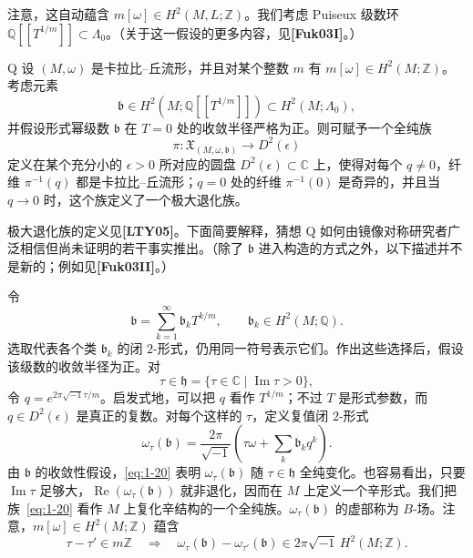 注意，这自动蕴含 $m[\omega]\in H^2(M,L;\mathbb Z)$。我们考虑 Puiseux 级数环 $\mathbb Q[[T^{1/m}]]\subset\Lambda_0$。（关于这一假设的更多内容，见\textbf{[Fuk03I]}。）

\begin{conjecture}{Q}\label{conj:intro-Q}
设 $(M,\omega)$ 是卡拉比--丘流形，并且对某个整数 $m$ 有
$m[\omega]\in H^2(M;\mathbb Z)$。考虑元素
\[
  \mathfrak b\in H^2(M;\mathbb Q[[T^{1/m}]])
  \subset H^2(M;\Lambda_0),
\]
并假设形式幂级数 $\mathfrak b$ 在 $T=0$ 处的收敛半径严格为正。则可赋予一个全纯族
\begin{equation}
  \pi:\mathfrak X_{(M,\omega,\mathfrak b)}\longrightarrow D^2(\epsilon)
  \tag{1.19}\label{eq:1-19}
\end{equation}
定义在某个充分小的 $\epsilon>0$ 所对应的圆盘 $D^2(\epsilon)\subset\mathbb C$ 上，使得对每个 $q\ne0$，纤维 $\pi^{-1}(q)$ 都是卡拉比--丘流形；$q=0$ 处的纤维 $\pi^{-1}(0)$ 是奇异的，并且当 $q\to0$ 时，这个族定义了一个极大退化族。
\end{conjecture}

极大退化族的定义见\textbf{[LTY05]}。下面简要解释，猜想 Q 如何由镜像对称研究者广泛相信但尚未证明的若干事实推出。（除了 $\mathfrak b$ 进入构造的方式之外，以下描述并不是新的；例如见\textbf{[Fuk03II]}。）

令
\[
  \mathfrak b=\sum_{k=1}^{\infty}\mathfrak b_kT^{k/m},
  \qquad \mathfrak b_k\in H^2(M;\mathbb Q).
\]
选取代表各个类 $\mathfrak b_k$ 的闭 $2$-形式，仍用同一符号表示它们。作出这些选择后，假设该级数的收敛半径为正。对
\[
  \tau\in\mathfrak h=\{\tau\in\mathbb C\mid\operatorname{Im}\tau>0\},
\]
令 $q=e^{2\pi\sqrt{-1}\tau/m}$。启发式地，可以把 $q$ 看作 $T^{1/m}$；不过 $T$ 是形式参数，而 $q\in D^2(\epsilon)$ 是真正的复数。对每个这样的 $\tau$，定义复值闭 $2$-形式
\begin{equation}
  \omega_\tau(\mathfrak b)
  =\frac{2\pi}{\sqrt{-1}}
   \left(\tau\omega+\sum_k\mathfrak b_kq^k\right).
  \tag{1.20}\label{eq:1-20}
\end{equation}
由 $\mathfrak b$ 的收敛性假设，\eqref{eq:1-20} 表明
$\omega_\tau(\mathfrak b)$ 随 $\tau\in\mathfrak h$ 全纯变化。也容易看出，只要
$\operatorname{Im}\tau$ 足够大，$\operatorname{Re}(\omega_\tau(\mathfrak b))$ 就非退化，因而在 $M$ 上定义一个辛形式。我们把族~\eqref{eq:1-20} 看作 $M$ 上复化辛结构的一个全纯族。$\omega_\tau(\mathfrak b)$ 的虚部称为 $B$-场。注意，$m[\omega]\in H^2(M;\mathbb Z)$ 蕴含
\begin{equation}
  \tau-\tau'\in m\mathbb Z
  \quad\Longrightarrow\quad
  \omega_\tau(\mathfrak b)-\omega_{\tau'}(\mathfrak b)
  \in2\pi\sqrt{-1}\,H^2(M;\mathbb Z).
  \tag{1.21}\label{eq:1-21}
\end{equation}

